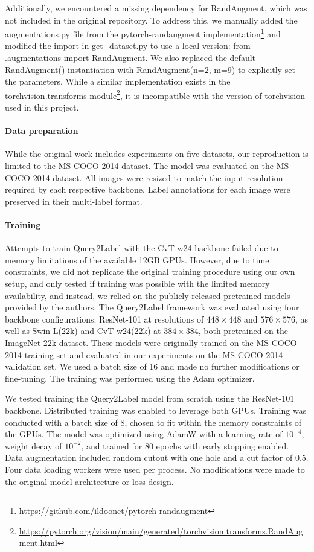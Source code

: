 \documentclass[lettersize,journal]{IEEEtran}
\begin{document}
Additionally, we encountered a missing dependency for RandAugment, which was not included in the original repository. To address this, we manually added the augmentations.py file from the pytorch-randaugment implementation\footnote{\url{https://github.com/ildoonet/pytorch-randaugment}} and modified the import in get\_dataset.py to use a local version: from .augmentations import RandAugment. We also replaced the default RandAugment() instantiation with RandAugment(n=2, m=9) to explicitly set the parameters. While a similar implementation exists in the torchvision.transforms module\footnote{\url{https://pytorch.org/vision/main/generated/torchvision.transforms.RandAugment.html}}, it is incompatible with the version of torchvision used in this project.

\paragraph{Data preparation}
While the original work includes experiments on five datasets, our reproduction is limited to the MS-COCO 2014 dataset. The model was evaluated on the MS-COCO 2014 dataset. All images were resized to match the input resolution required by each respective backbone. Label annotations for each image were preserved in their multi-label format.

\paragraph{Training}
Attempts to train Query2Label with the CvT-w24 backbone failed due to memory limitations of the available 12GB GPUs. However, due to time constraints, we did not replicate the original training procedure using our own setup, and only tested if training was possible with the limited memory availability, and instead, we relied on the publicly released pretrained models provided by the authors. The Query2Label framework was evaluated using four backbone configurations: ResNet-101 at resolutions of $448\times448$ and $576\times576$, as well as Swin-L(22k) and CvT-w24(22k) at $384\times384$, both pretrained on the ImageNet-22k \cite{imagenet} dataset. These models were originally trained on the MS-COCO 2014 training set and evaluated in our experiments on the MS-COCO 2014 validation set. We used a batch size of 16 and made no further modifications or fine-tuning. The training was performed using the Adam optimizer. 


We tested training the Query2Label model from scratch using the ResNet-101 backbone. Distributed training was enabled to leverage both GPUs. Training was conducted with a batch size of 8, chosen to fit within the memory constraints of the GPUs. The model was optimized using AdamW with a learning rate of $10^{-4}$, weight decay of $10^{-2}$, and trained for 80 epochs with early stopping enabled. Data augmentation included random cutout with one hole and a cut factor of 0.5. Four data loading workers were used per process. No modifications were made to the original model architecture or loss design.
\end{document}
